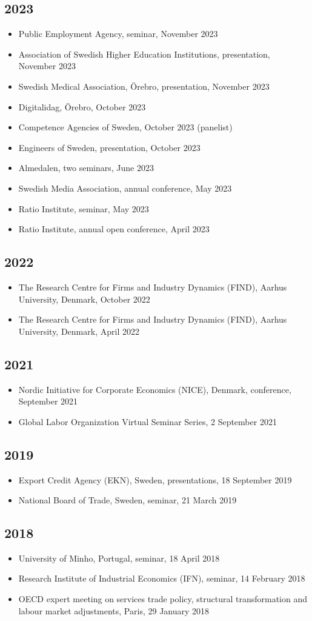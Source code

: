 \documentclass[11pt,a4paper]{article}
\newcommand{\cventry}[1]{\item #1}
\begin{document}
\subsection{2023}
\begin{itemize}
  \cventry{Public Employment Agency, seminar, November 2023}
  \cventry{Association of Swedish Higher Education Institutions, presentation, November 2023}
  \cventry{Swedish Medical Association, Örebro, presentation, November 2023}
  \cventry{Digitalidag, Örebro, October 2023}
  \cventry{Competence Agencies of Sweden, October 2023 (panelist)}
  \cventry{Engineers of Sweden, presentation, October 2023}
  \cventry{Almedalen, two seminars, June 2023}
  \cventry{Swedish Media Association, annual conference, May 2023}
  \cventry{Ratio Institute, seminar, May 2023}
  \cventry{Ratio Institute, annual open conference, April 2023}
\end{itemize}

\subsection{2022}
\begin{itemize}
  \cventry{The Research Centre for Firms and Industry Dynamics (FIND), Aarhus University, Denmark, October 2022}
  \cventry{The Research Centre for Firms and Industry Dynamics (FIND), Aarhus University, Denmark, April 2022}
\end{itemize}

\subsection{2021}
\begin{itemize}
  \cventry{Nordic Initiative for Corporate Economics (NICE), Denmark, conference, September 2021}
  \cventry{Global Labor Organization Virtual Seminar Series, 2 September 2021}
\end{itemize}

\subsection{2019}
\begin{itemize}
  \cventry{Export Credit Agency (EKN), Sweden, presentations, 18 September 2019}
  \cventry{National Board of Trade, Sweden, seminar, 21 March 2019}
\end{itemize}

\subsection{2018}
\begin{itemize}
  \cventry{University of Minho, Portugal, seminar, 18 April 2018}
  \cventry{Research Institute of Industrial Economics (IFN), seminar, 14 February 2018}
  \cventry{OECD expert meeting on services trade policy, structural transformation and labour market adjustments, Paris, 29 January 2018}
\end{itemize}
\end{document}
